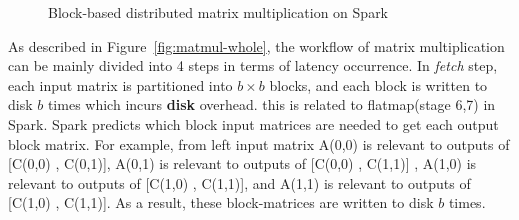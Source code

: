 \documentclass[10pt, conference, compsocconf]{IEEEtran}
\begin{document}
\begin{figure}
    
            \centering{}

            \centering{}

    \caption{\label{fig:matmul}Block-based distributed matrix multiplication on Spark }
\end{figure}

As described in Figure~\ref{fig:matmul-whole}, the workflow of matrix multiplication can be mainly divided into 4 steps in terms of latency occurrence. In \textit{fetch} step, each input matrix is partitioned into $b\times b$ blocks, and each block is written to disk $b$ times which incurs \textbf{disk} overhead. this is related to flatmap(stage 6,7) in Spark. Spark predicts which block input matrices are needed to get each output block matrix. For example, from left input matrix A(0,0) is relevant to outputs of [C(0,0) , C(0,1)], A(0,1) is relevant to outputs of [C(0,0) , C(1,1)] , A(1,0) is relevant to outputs of [C(1,0) , C(1,1)], and A(1,1) is relevant to outputs of [C(1,0) , C(1,1)]. As a result, these block-matrices are written to disk $b$ times. 
\end{document}
